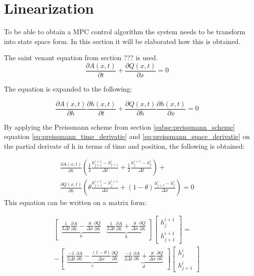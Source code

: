 \section{Linearization}\label{se:linearization}
To be able to obtain a MPC control algorithm the system needs to be transform into state space form. In this section it will be elaborated how this is obtained.


The saint venant equation from section ??? is used. 
\begin{equation}\label{eq:linearization_Continuity}
\frac{\partial A(x,t)}{\partial t} + \frac{\partial Q(x,t)}{\partial x}=0
\end{equation}

The equation is expanded to the following:

\begin{equation}
	\frac{\partial A(x,t)}{\partial h}\frac{\partial h(x,t)}{\partial t} + \frac{\partial Q(x,t)}{\partial h}\frac{\partial h(x,t)}{\partial x}=0
\end{equation}

By applying the Preissmann scheme from section \ref{subse:preissmann_scheme} equation \ref{eq:preissmann_time_derivatie} and \ref{eq:preissmann_space_derivatie} on the partial derivate of h in terms of time and position, the following is obtained: 

\begin{multline}
	\frac{\partial A(x,t)}{\partial h} \left(\frac{1}{2}\frac{h_{j+1}^{i+1}-h_{j+1}^i}{\Delta t} +  \frac{1}{2} \frac{h_{j}^{i+1} - h_j^i}{\Delta t}\right) + \\ \frac{\partial Q(x,t)}{\partial h}\left(\theta \frac{h_{j+1}^{i+1}-h_j^{i+1}}{\Delta x}+(1-\theta)\frac{h_{j+1}^i - h_j^i}{\Delta x}\right)=0
\end{multline}
This equation can be written on a matrix form:

\begin{equation}
\begin{aligned}
	\begin{bmatrix}
		\underbrace{\frac{1}{2\Delta t}\frac{\partial A}{\partial h}-\frac{\theta}{\Delta x}\frac{\partial Q}{\partial h}}_{a}  & \underbrace{\frac{1}{2\Delta t}\frac{\partial A}{\partial h}+\frac{\theta}{\Delta x}\frac{\partial Q}{\partial h}}_{b} 
	\end{bmatrix}
	\begin{bmatrix}
		h_{j}^{i+1} \\
		h_{j+1}^{i+1}
	\end{bmatrix}
	= \\ -
	\begin{bmatrix}
		\underbrace{\frac{-1}{2\Delta t}\frac{\partial A}{\partial h}-\frac{(1-\theta)}{\Delta x}\frac{\partial Q}{\partial h}}_{c} & \underbrace{\frac{-1}{2\Delta t}\frac{\partial A}{\partial h}+\frac{\theta}{\Delta x}\frac{\partial Q}{\partial h}}_{d} 
	\end{bmatrix}
	\begin{bmatrix}
		h_{j}^{i} \\
		h_{j+1}^{i}
	\end{bmatrix}
	\end{aligned}
\end{equation}

